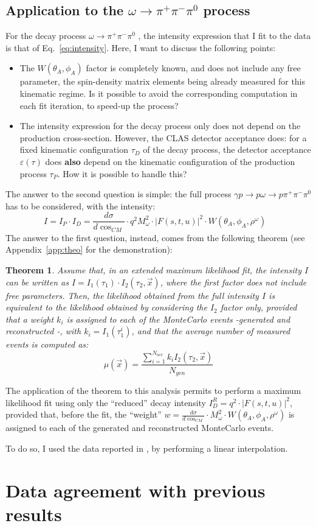 \documentclass[a4paper,10pt]{report}
\newcommand{\decay}{$\omega \rightarrow \pi^+ \pi^- \pi^0$ }
\newcommand{\fullreaction}{$\gamma p \rightarrow p \omega \rightarrow p \pi^+ \pi^- \pi^{0}$ }
\newtheorem{theorem}{Theorem}
\newcommand{\printteolike}{
Assume that, in an extended maximum likelihood fit, the intensity $I$ can be written as $I=I_1(\tau_1) \cdot I_2(\tau_2,\vec{x})$,
where the first factor does not include free parameters. Then, the likelihood obtained from the full intensity $I$ is equivalent to the
likelihood obtained by considering the $I_2$ factor only, provided that a weight $k_i$ is assigned to each of the MonteCarlo events -generated and reconstructed -, with $k_i=I_1(\tau^i_1)$, and that the average number of measured events is computed as:
\begin{equation}
\mu(\vec{x})=\frac{\sum_{i=1}^{N_{acc}}k_iI_2(\tau_2,\vec{x})}{N_{gen}}
\end{equation}
}
\begin{document}
\section{Application to the \decay process}\label{sec:application}

For the decay process \decay, the intensity expression that I fit to the data is that of Eq.~\ref{eq:intensity}. Here, I want to discuss the following points:
\begin{itemize}
\item{The $W(\theta_A,\phi_A)$ factor is completely known, and does not include any free parameter, the spin-density matrix elements being already measured for this kinematic regime.
Is it possible to avoid the corresponding computation in each fit iteration, to speed-up the process?}
\item{The intensity expression for the decay process only does not depend on the production cross-section. However, the CLAS detector acceptance does: for a fixed kinematic configuration $\tau_D$ of the decay process,
the detector acceptance $\varepsilon(\tau)$ does \textbf{also} depend on the kinematic configuration of the production process $\tau_P$. How it is possible to handle this?}
\end{itemize}

The answer to the second question is simple: the full process \fullreaction has to be considered, with the intensity:
\begin{equation}\label{eq:fullintensity}
I = I_P \cdot I_D = \frac{d\sigma}{d\cos_{CM}}\cdot q^2M^2_\omega \cdot |F(s,t,u)|^2 \cdot W(\theta_A, \phi_A, \rho^\omega) \; \; \;
\end{equation}
The answer to the first question, instead, comes from the following theorem (see Appendix~\ref{app:theo} for the demonstration):
\begin{theorem}
\printteolike
\end{theorem}

The application of the theorem to this analysis permits to perform a maximum likelihood fit using only the ``reduced'' decay intensity $I^{R}_D=q^2\cdot |F(s,t,u)|^2$, provided that, before the fit, the ``weight'' 
$w= \frac{d\sigma}{d\cos_{CM}}\cdot M^2_\omega \cdot W(\theta_A, \phi_A, \rho^\omega)$ is assigned to each of the generated and reconstructed MonteCarlo events.

To do so, I used the data reported in \cite{Williams:2009ab}, by performing a linear interpolation. 

\chapter{Data agreement with previous results}
\end{document}
